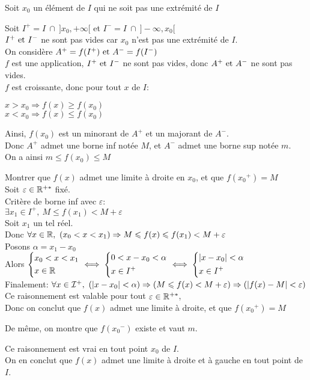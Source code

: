 \documentclass[12pt,twoside,a4paper]{article}
\begin{document}
		\begin{preuve}
			Soit $x_0$ un élément de $I$ qui ne soit pas une extrémité de $I$
			\begin{liste}
				\item Soit $I^{+}=I\ \cap\  ]x_0,+\infty[$ et $I^{-}=I\ \cap\  ]-\infty,x_0[$\\
					$I^{+}\text{ et } I^{-}$ ne sont pas vides car $x_0$ n'est pas une extrémité de $I$.\\
					On considère $A^{+}=f(I^{+})\text{ et } A^{-}=f(I^{-})$\\
					$f$ est une application, $I^{+}\text{ et } I^{-}$ ne sont pas vides, donc $A^{+}\text{ et } A^{-}$ ne sont pas vides.\\
					$f$ est croissante, donc pour tout $x$ de $I$:
					\begin{tab}
						$x>x_0\Rightarrow f(x)\geqslant f(x_0)$\\
						$x<x_0\Rightarrow f(x)\leqslant f(x_0)$
					\end{tab}
					Ainsi, $f(x_0)$ est un minorant de $A^{+}$ et un majorant de $A^{-}$.\\
					Donc $A^{+}$ admet une borne inf notée $M$, et $A^{-}$ admet une borne sup notée $m$.\\
					On a ainsi $m\leqslant f(x_0)\leqslant M$
				\item Montrer que $f(x)$ admet une limite \`a droite en $x_0$, et que $f({x_0}^{+})=M$\\
					Soit $\varepsilon\in\mathbb{R}^{+*}$ fixé.\\
					Critère de borne inf avec $\varepsilon$:\\
					$\exists x_1\in I^{+},\ M\leqslant f(x_1) <M+\varepsilon$\\
					Soit $x_1$ un tel réel.\\
					Donc $\forall x\in\R,\ (x_0<x<x_1)\Rightarrow M\leqslant f(x)\leqslant f(x_1)<M+\varepsilon$\\
					Posons $\alpha = x_1-x_0$\\
					Alors $\left\{\begin{aligned}& x_0<x<x_1\\& x\in\mathbb{R}\end{aligned}\right.\iff \left\{\begin{aligned}& 0<x-x_0<\alpha\\& x\in I^{+}\end{aligned}\right.\iff \left\{\begin{aligned}&|x-x_0|<\alpha\\& x\in I^{+}\end{aligned}\right.$\\
					Finalement: $\forall x\in\I^{+},\ (|x-x_0|<\alpha)\Rightarrow (M\leqslant f(x)<M+\varepsilon)\Rightarrow (|f(x)-M|<\varepsilon)$\\
					Ce raisonnement est valable pour tout $\varepsilon\in\mathbb{R}^{+*}$,\\
					Donc on conclut que $f(x)$ admet une limite \`a droite, et que $f({x_0}^{+})=M$
				\item De m\^eme, on montre que $f({x_0}^{-})$ existe et vaut $m$.
			\end{liste}
			Ce raisonnement est vrai en tout point $x_0$ de $I$.\\
			On en conclut que $f(x)$ admet une limite \`a droite et \`a gauche en tout point de $I$.
		\end{preuve}
\end{document}
